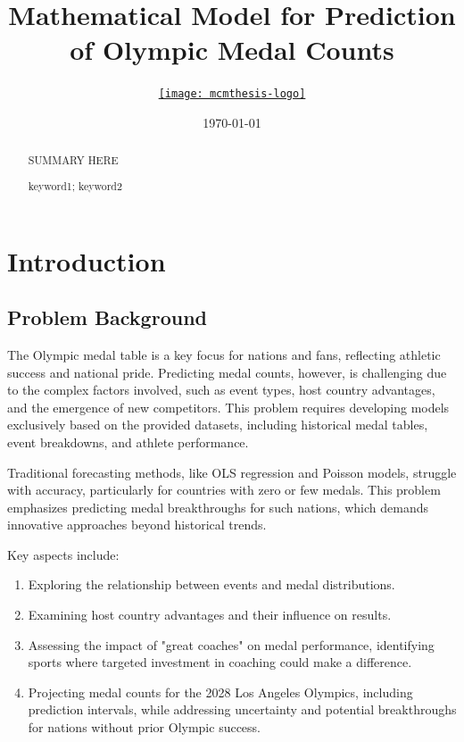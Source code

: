 \documentclass{mcmthesis}
\title{Mathematical Model for Prediction of Olympic Medal Counts}
\author{\small \href{https://www.latexstudio.net/}
  {\texttt{[image: mcmthesis-logo]}}}
\date{\today}
\begin{document}
\begin{abstract}
    \par 
        SUMMARY HERE

\begin{keywords}
    keyword1; keyword2
\end{keywords}

\end{abstract}
\maketitle
\tableofcontents
\newpage

\section{Introduction}
\subsection{Problem Background}
The Olympic medal table is a key focus for nations and fans, reflecting athletic success and national pride. Predicting medal counts, however, is challenging due to the complex factors involved, such as event types, host country advantages, and the emergence of new competitors. This problem requires developing models exclusively based on the provided datasets, including historical medal tables, event breakdowns, and athlete performance.

Traditional forecasting methods, like OLS regression and Poisson models, struggle with accuracy, particularly for countries with zero or few medals. This problem emphasizes predicting medal breakthroughs for such nations, which demands innovative approaches beyond historical trends.

Key aspects include:
\begin{enumerate}
    \item Exploring the relationship between events and medal distributions.
    \item Examining host country advantages and their influence on results.
    \item Assessing the impact of "great coaches" on medal performance, identifying sports where targeted investment in coaching could make a difference.
    \item Projecting medal counts for the 2028 Los Angeles Olympics, including prediction intervals, while addressing uncertainty and potential breakthroughs for nations without prior Olympic success.
\end{enumerate}
\end{document}
